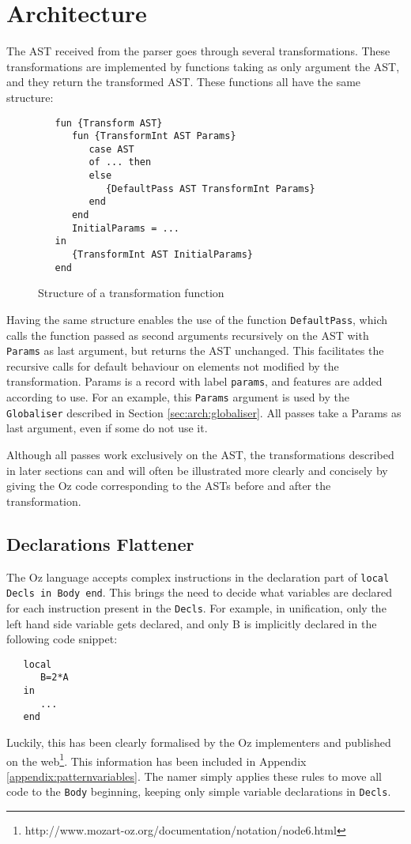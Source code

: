 \documentclass[a4paper]{memoir}
\begin{document}
\section{Architecture}
The AST received from the parser goes through several transformations. These transformations are implemented by functions taking as only argument the AST, and they return the transformed AST.
These functions all have the same structure:
\begin{figure}[h]
\begin{lstlisting}
   fun {Transform AST}
      fun {TransformInt AST Params}
         case AST
         of ... then
         else
            {DefaultPass AST TransformInt Params}
         end
      end
      InitialParams = ...
   in
      {TransformInt AST InitialParams}
   end
\end{lstlisting}
\caption{Structure of a transformation function}
\end{figure}
Having the same structure enables the use of the function \lstinline!DefaultPass!, which calls the function passed as second arguments recursively on the AST with \lstinline!Params! as last argument, but returns the AST unchanged. This facilitates the recursive calls for default behaviour on elements not modified by the transformation.
Params is a record with label \lstinline!params!, and features are added
according to use. For an example, this \lstinline!Params! argument is used by
the \lstinline!Globaliser! described in Section \ref{sec:arch:globaliser}. All
passes take a Params as last argument, even if some do not use it. 


Although all passes work exclusively on the AST, the transformations described in later sections can and will often be illustrated more clearly and concisely by giving the Oz code corresponding to the ASTs before and after the transformation. 

\subsection{Declarations Flattener}\label{sec:arch:declsflattener}
The Oz language accepts complex instructions in the declaration part of \lstinline!local Decls in Body end!. This brings the need to decide what variables are declared for each instruction present in the \lstinline!Decls!. 
For example, in unification, only the left hand side variable gets declared, and only B is implicitly declared in the following code snippet:
\begin{lstlisting}
   local
      B=2*A
   in
      ...
   end
\end{lstlisting}
Luckily, this has been clearly formalised by the Oz implementers and published on the web\footnote[]{http://www.mozart-oz.org/documentation/notation/node6.html}. This information has been included in Appendix \ref{appendix:patternvariables}. The namer simply applies these rules to move all code to the \lstinline!Body! beginning, keeping only simple variable declarations in \lstinline!Decls!.
\end{document}
